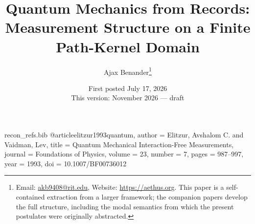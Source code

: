\begin{filecontents}[overwrite]{recon_refs.bib}
@article{elitzur1993quantum,
  author  = {Elitzur, Avshalom C. and Vaidman, Lev},
  title   = {Quantum Mechanical Interaction-Free Measurements},
  journal = {Foundations of Physics},
  volume  = {23},
  number  = {7},
  pages   = {987--997},
  year    = {1993},
  doi     = {10.1007/BF00736012}
}
\end{filecontents}

\documentclass[11pt]{article}
\usepackage[margin=0.95in]{geometry}
\usepackage{amsmath, amssymb, amsthm}
\usepackage[hidelinks]{hyperref}
\usepackage{microtype}
\usepackage{booktabs}
\usepackage[style=numeric, sorting=none]{biblatex}


\newtheorem{theorem}{Theorem}
\newtheorem{proposition}{Proposition}
\newtheorem{corollary}{Corollary}
\newtheorem{lemma}{Lemma}
\newtheorem{claim}[lemma]{Claim}
\theoremstyle{definition}
\newtheorem{postulate}{Postulate}

\title{Quantum Mechanics from Records:\\ \large Measurement Structure on a Finite Path-Kernel Domain}
\author{Ajax Benander\thanks{Email: \href{mailto:akb9408@rit.edu}{akb9408@rit.edu}, Website: \url{https://aethus.org}. This paper is a self-contained extraction from a larger framework; the companion papers \cite{AethusBrief, Aethus} develop the full structure, including the modal semantics from which the present postulates were originally abstracted.}}
\date{First posted July 17, 2026\\ {\small This version: November 2026 --- draft}}


\maketitle

